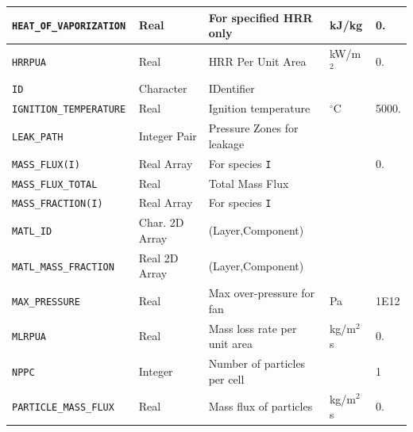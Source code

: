 \documentclass[11pt]{book}
\newcommand{\ct}{\tt\small}
\begin{document}
\begin{longtable}{|l|l|l|l|l|}
{\ct HEAT\_OF\_VAPORIZATION }         & Real            & For specified HRR only            & kJ/kg               & 0.                      \\ \hline
{\ct HRRPUA }                         & Real            & HRR Per Unit Area                 & kW/m$^2$            & 0.                      \\ \hline
{\ct ID     }                         & Character       & IDentifier                        &                     &                         \\ \hline
{\ct IGNITION\_TEMPERATURE}           & Real            & Ignition temperature              & $^\circ$C           & 5000.                   \\ \hline
{\ct LEAK\_PATH}                      & Integer Pair    & Pressure Zones for leakage        &                     &                         \\ \hline
{\ct MASS\_FLUX(I)}                   & Real Array      & For species {\ct I}               &                     & 0.                      \\ \hline
{\ct MASS\_FLUX\_TOTAL}               & Real            & Total Mass Flux                   &                     &                         \\ \hline
{\ct MASS\_FRACTION(I)}               & Real Array      & For species {\ct I}               &                     &                         \\ \hline
{\ct MATL\_ID}                        & Char. 2D Array  & (Layer,Component)                 &                     &                         \\ \hline
{\ct MATL\_MASS\_FRACTION}            & Real 2D Array   & (Layer,Component)                 &                     &                         \\ \hline
{\ct MAX\_PRESSURE }                  & Real            & Max over-pressure for fan         & Pa                  & 1E12                    \\ \hline
{\ct MLRPUA }                         & Real            & Mass loss rate per unit area      & kg/m$^2$s           & 0.                      \\ \hline
{\ct NPPC}                            & Integer         & Number of particles per cell      &                     & 1                       \\ \hline
{\ct PARTICLE\_MASS\_FLUX}            & Real            & Mass flux of particles            & kg/m$^2$ s          & 0.                      \\ \hline

\end{longtable}
\end{document}
